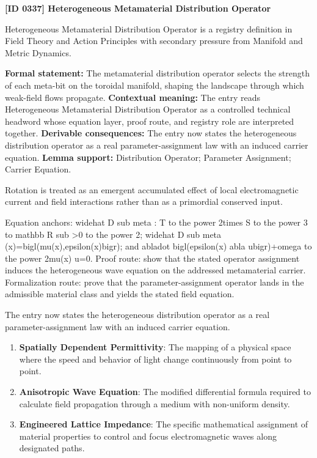 \clearpage
\noindent\textbf{[ID 0337] Heterogeneous Metamaterial Distribution Operator}\par
\vspace{0.35em}
\begingroup\small
{}
Heterogeneous Metamaterial Distribution Operator is a registry definition in Field Theory and Action Principles with secondary pressure from Manifold and Metric Dynamics.

\begingroup\footnotesize\setlength{\emergencystretch}{3em}\sloppy
\textbf{Formal statement:} The metamaterial distribution operator selects the strength of each meta-bit on the toroidal manifold, shaping the landscape through which weak-field flows propagate. \textbf{Contextual meaning:} The entry reads Heterogeneous Metamaterial Distribution Operator as a controlled technical headword whose equation layer, proof route, and registry role are interpreted together. \textbf{Derivable consequences:} The entry now states the heterogeneous distribution operator as a real parameter-assignment law with an induced carrier equation. \textbf{Lemma support:} Distribution Operator; Parameter Assignment; Carrier Equation.\par
\endgroup

Rotation is treated as an emergent accumulated effect of local electromagnetic current and field interactions rather than as a primordial conserved input.

Equation anchors: widehat D sub meta : T to the power 2times S to the power 3 to mathbb R sub >0 to the power 2; widehat D sub meta (x)=bigl(mu(x),epsilon(x)bigr); and abladot bigl(epsilon(x) abla ubigr)+omega to the power 2mu(x) u=0. Proof route: show that the stated operator assignment induces the heterogeneous wave equation on the addressed metamaterial carrier. Formalization route: prove that the parameter-assignment operator lands in the admissible material class and yields the stated field equation.

The entry now states the heterogeneous distribution operator as a real parameter-assignment law with an induced carrier equation.
\endgroup

\begin{enumerate}[leftmargin=1.6em,itemsep=6pt,topsep=4pt]
\item \textbf{Spatially Dependent Permittivity}: The mapping of a physical space where the speed and behavior of light change continuously from point to point.
\item \textbf{Anisotropic Wave Equation}: The modified differential formula required to calculate field propagation through a medium with non-uniform density.
\item \textbf{Engineered Lattice Impedance}: The specific mathematical assignment of material properties to control and focus electromagnetic waves along designated paths.
\end{enumerate}

